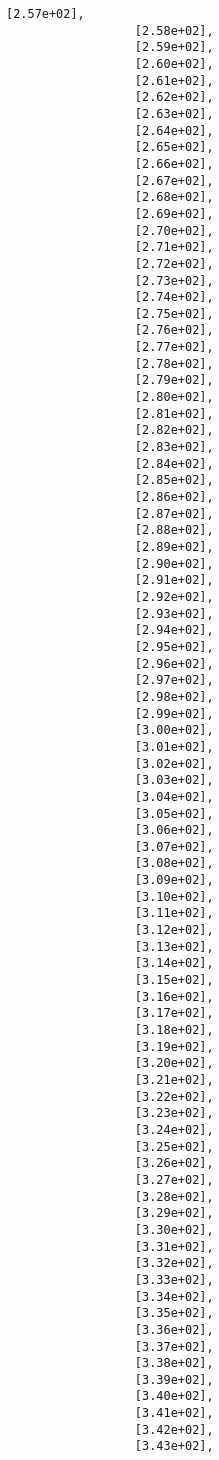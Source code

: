 \documentclass[11pt]{article}
\begin{document}
\begin{Verbatim}[commandchars=\\\{\}]
                  [2.57e+02],
                  [2.58e+02],
                  [2.59e+02],
                  [2.60e+02],
                  [2.61e+02],
                  [2.62e+02],
                  [2.63e+02],
                  [2.64e+02],
                  [2.65e+02],
                  [2.66e+02],
                  [2.67e+02],
                  [2.68e+02],
                  [2.69e+02],
                  [2.70e+02],
                  [2.71e+02],
                  [2.72e+02],
                  [2.73e+02],
                  [2.74e+02],
                  [2.75e+02],
                  [2.76e+02],
                  [2.77e+02],
                  [2.78e+02],
                  [2.79e+02],
                  [2.80e+02],
                  [2.81e+02],
                  [2.82e+02],
                  [2.83e+02],
                  [2.84e+02],
                  [2.85e+02],
                  [2.86e+02],
                  [2.87e+02],
                  [2.88e+02],
                  [2.89e+02],
                  [2.90e+02],
                  [2.91e+02],
                  [2.92e+02],
                  [2.93e+02],
                  [2.94e+02],
                  [2.95e+02],
                  [2.96e+02],
                  [2.97e+02],
                  [2.98e+02],
                  [2.99e+02],
                  [3.00e+02],
                  [3.01e+02],
                  [3.02e+02],
                  [3.03e+02],
                  [3.04e+02],
                  [3.05e+02],
                  [3.06e+02],
                  [3.07e+02],
                  [3.08e+02],
                  [3.09e+02],
                  [3.10e+02],
                  [3.11e+02],
                  [3.12e+02],
                  [3.13e+02],
                  [3.14e+02],
                  [3.15e+02],
                  [3.16e+02],
                  [3.17e+02],
                  [3.18e+02],
                  [3.19e+02],
                  [3.20e+02],
                  [3.21e+02],
                  [3.22e+02],
                  [3.23e+02],
                  [3.24e+02],
                  [3.25e+02],
                  [3.26e+02],
                  [3.27e+02],
                  [3.28e+02],
                  [3.29e+02],
                  [3.30e+02],
                  [3.31e+02],
                  [3.32e+02],
                  [3.33e+02],
                  [3.34e+02],
                  [3.35e+02],
                  [3.36e+02],
                  [3.37e+02],
                  [3.38e+02],
                  [3.39e+02],
                  [3.40e+02],
                  [3.41e+02],
                  [3.42e+02],
                  [3.43e+02],

\end{Verbatim}
\end{document}
